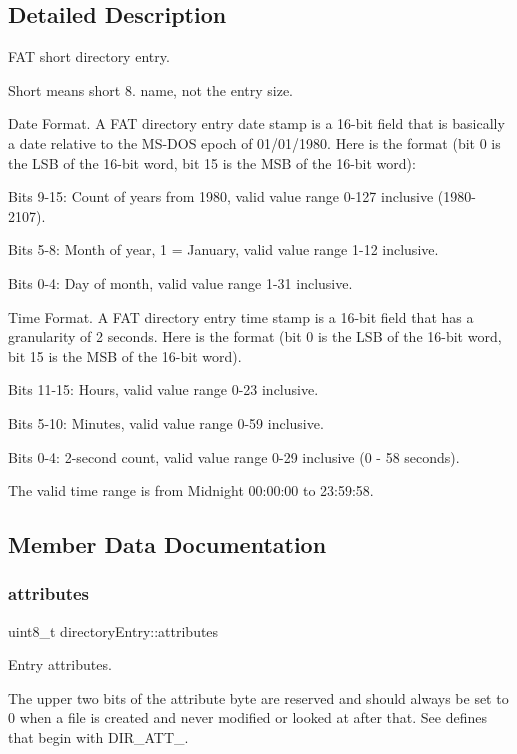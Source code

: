 \subsection{Detailed Description}
F\+AT short directory entry. 

Short means short 8. name, not the entry size.

Date Format. A F\+AT directory entry date stamp is a 16-\/bit field that is basically a date relative to the M\+S-\/\+D\+OS epoch of 01/01/1980. Here is the format (bit 0 is the L\+SB of the 16-\/bit word, bit 15 is the M\+SB of the 16-\/bit word)\+:

Bits 9-\/15\+: Count of years from 1980, valid value range 0-\/127 inclusive (1980-\/2107).

Bits 5-\/8\+: Month of year, 1 = January, valid value range 1-\/12 inclusive.

Bits 0-\/4\+: Day of month, valid value range 1-\/31 inclusive.

Time Format. A F\+AT directory entry time stamp is a 16-\/bit field that has a granularity of 2 seconds. Here is the format (bit 0 is the L\+SB of the 16-\/bit word, bit 15 is the M\+SB of the 16-\/bit word).

Bits 11-\/15\+: Hours, valid value range 0-\/23 inclusive.

Bits 5-\/10\+: Minutes, valid value range 0-\/59 inclusive.

Bits 0-\/4\+: 2-\/second count, valid value range 0-\/29 inclusive (0 -\/ 58 seconds).

The valid time range is from Midnight 00\+:00\+:00 to 23\+:59\+:58. 

\subsection{Member Data Documentation}
\mbox{\label{structdirectory_entry_a16c6cde55c8175c90935c386f1cfb21a}} 
\subsubsection{\texorpdfstring{attributes}{attributes}}
{\footnotesize\ttfamily uint8\+\_\+t directory\+Entry\+::attributes}

Entry attributes.

The upper two bits of the attribute byte are reserved and should always be set to 0 when a file is created and never modified or looked at after that. See defines that begin with D\+I\+R\+\_\+\+A\+T\+T\+\_\+. \mbox{\label{structdirectory_entry_a7b43372794655fe6604d3c17c02302fe}} 
